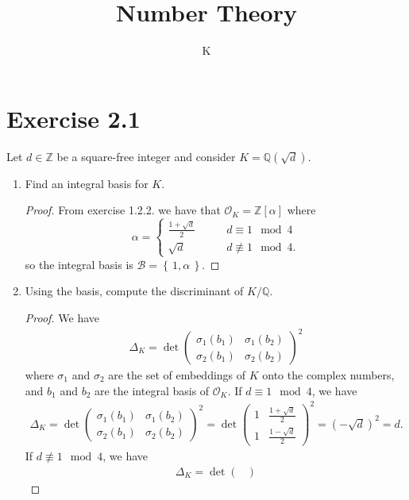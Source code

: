 \documentclass[a4paper]{article}
\title{Number Theory}
\author{K}
\newcommand{\set}[1]{\left\{\, #1 \,\right\}}
\begin{document}
\section*{Exercise 2.1}
Let \(d \in \mathbb{Z}\) be a square-free integer and consider \(K = \mathbb{Q}(\sqrt{d})\).
\begin{enumerate}
  \item Find an integral basis for \(K\).
  \begin{proof}
    From exercise 1.2.2. we have that \(\mathcal{O}_K = \mathbb{Z}[\alpha]\) where
    \begin{equation*}
      \alpha = \begin{cases}
        \frac{1 + \sqrt{d}}{2} &\qquad d \equiv 1 \mod{4} \\
        \sqrt{d} &\qquad d \not\equiv 1 \mod{4} \text{.}
      \end{cases}
    \end{equation*}
    so the integral basis is \(\mathcal{B} = \set{1, \alpha}\).
  \end{proof}
  \item Using the basis, compute the discriminant of \(K / \mathbb{Q}\).
  \begin{proof}
    We have
    \begin{align*}
      \Delta_K = \det \begin{pmatrix}
        \sigma_1(b_1) & \sigma_1(b_2) \\
        \sigma_2(b_1) & \sigma_2(b_2)
      \end{pmatrix}^2
    \end{align*}
    where \(\sigma_1\) and \(\sigma_2\) are the set of embeddings of \(K\) onto the complex numbers, and \(b_1\) and \(b_2\) are the integral basis of \(\mathcal{O}_K\). If \(d \equiv 1 \mod{4}\), we have
    \begin{align*}
      \Delta_K = \det \begin{pmatrix}
        \sigma_1(b_1) & \sigma_1(b_2) \\
        \sigma_2(b_1) & \sigma_2(b_2)
      \end{pmatrix}^2
      = \det \begin{pmatrix}
        1 & \frac{1 + \sqrt{d}}{2} \\
        1 & \frac{1 - \sqrt{d}}{2}
      \end{pmatrix}^2
      = (-\sqrt{d})^2 = d \text{.}
    \end{align*}
    If \(d \not\equiv 1 \mod{4}\), we have
    \begin{align*}
      \Delta_K = \det \begin{pmatrix}

\end{pmatrix}
\end{align*}
\end{proof}
\end{enumerate}
\end{document}
